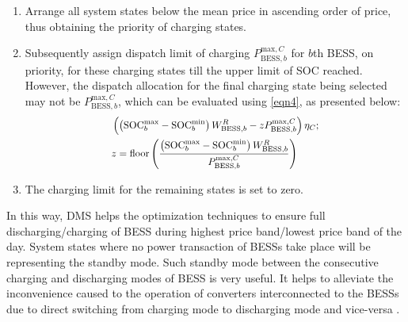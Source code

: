 \documentclass[journal]{IEEEtran}
\begin{document}
 \begin{enumerate}
	 	\item Arrange all system states below the mean price in ascending order of price, thus obtaining the priority of charging states.
	 	\item Subsequently assign dispatch limit of charging $P_{\text{BESS},b}^{\text{max},C}$ for $b$th BESS, on priority, for these charging states till the upper limit of SOC reached. However, the dispatch allocation for the final charging state being selected may not be $P_{\text{BESS},b}^{\text{max},C}$, which can be evaluated using \eqref{eqn4}, as presented below:
	 	\begin{equation}
	 		\scalebox{0.9}[0.9]{$
	 	\begin{split}
	 	& \left( \left( \text{SOC}_{b}^{\text{max}}-\text{SOC}_{b}^{\text{min}} \right)W_{\text{BESS},b}^{R}-zP_{\text{BESS},b}^{\text{max},C} \right){{\eta }_{C}}; \\ & z=\text{floor}\left( \frac{\left( \text{SOC}_{b}^{\text{max}}-\text{SOC}_{b}^{\text{min}} \right)W_{\text{BESS},b}^{R}}{P_{\text{BESS},b}^{\text{max},C}} \right)
	 	\end{split}
	 	$}
	 	\label{eqn4}
	 	\end{equation}
	 	\item The charging limit for the remaining states is set to zero. 	
	\end{enumerate}
	In this way, DMS helps the optimization techniques to ensure full discharging/charging of BESS during highest price band/lowest price band of the day. System states where no power transaction of BESSs take place will be representing the standby mode. Such standby mode between the consecutive charging and discharging modes of BESS is very useful. It helps to alleviate the inconvenience caused to the operation of converters interconnected to the BESSs due to direct switching from charging mode to discharging mode and vice-versa \cite{7973220}. 
\end{document}
